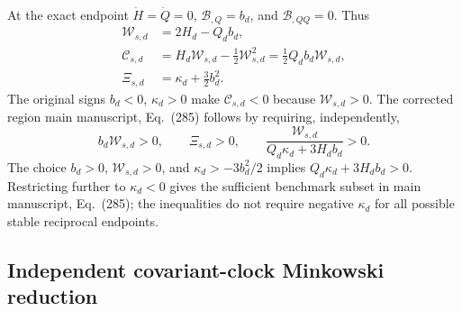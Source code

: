 \documentclass[aps,prd,reprint,onecolumn,notitlepage,nofootinbib,longbibliography,floatfix]{revtex4-2}
\theoremstyle{scstyle}
\theoremstyle{definition}
\theoremstyle{remark}
\newcommand{\cB}{\mathcal B}
\begin{document}
At the exact endpoint $\dot H=\dot Q=0$, $\cB_{,Q}=b_d$, and $\cB_{,QQ}=0$. Thus
\begin{align}
\mathcal W_{s,d}&=2H_d-Q_db_d,
\nonumber\\
\mathcal C_{s,d}
&=H_d\mathcal W_{s,d}-\frac12\mathcal W_{s,d}^2
=\frac12Q_db_d\mathcal W_{s,d},
\label{eq:lateCsproof}\\
\Xi_{s,d}&=\kappa_d+\frac32b_d^2.
\label{eq:lateXiproof}
\end{align}
The original signs $b_d<0$, $\kappa_d>0$ make $\mathcal C_{s,d}<0$ because $\mathcal W_{s,d}>0$. The corrected region main manuscript, Eq.~(285) follows by requiring, independently,
\begin{equation}
b_d\mathcal W_{s,d}>0,
\qquad
\Xi_{s,d}>0,
\qquad
\frac{\mathcal W_{s,d}}{Q_d\kappa_d+3H_db_d}>0.
\label{eq:lateinequalityderivation}
\end{equation}
The choice $b_d>0$, $\mathcal W_{s,d}>0$, and $\kappa_d>-3b_d^2/2$ implies $Q_d\kappa_d+3H_db_d>0$. Restricting further to $\kappa_d<0$ gives the sufficient benchmark subset in main manuscript, Eq.~(285); the inequalities do not require negative $\kappa_d$ for all possible stable reciprocal endpoints.

\subsection{Independent covariant-clock Minkowski reduction}
\end{document}
